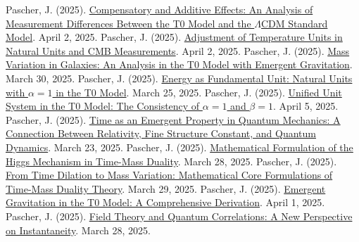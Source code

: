 \documentclass[12pt,a4paper]{article}
\begin{document}
	\begin{thebibliography}{99}
		 Pascher, J. (2025). \href{https://github.com/jpascher/T0-Time-Mass-Duality/tree/main/2/pdf/English/MessdifferenzenT0StandardEn.pdf}{Compensatory and Additive Effects: An Analysis of Measurement Differences Between the T0 Model and the \(\Lambda\)CDM Standard Model}. April 2, 2025.
		 Pascher, J. (2025). \href{https://github.com/jpascher/T0-Time-Mass-Duality/tree/main/2/pdf/English/TempEinheitenCMBEn.pdf}{Adjustment of Temperature Units in Natural Units and CMB Measurements}. April 2, 2025.
		 Pascher, J. (2025). \href{https://github.com/jpascher/T0-Time-Mass-Duality/tree/main/2/pdf/English/MassVarGalaxienEn.pdf}{Mass Variation in Galaxies: An Analysis in the T0 Model with Emergent Gravitation}. March 30, 2025.
		 Pascher, J. (2025). \href{https://github.com/jpascher/T0-Time-Mass-Duality/tree/main/2/pdf/English/NatEinheitenAlpha1En.pdf}{Energy as Fundamental Unit: Natural Units with \(\alpha = 1\) in the T0 Model}. March 25, 2025.
		 Pascher, J. (2025). \href{https://github.com/jpascher/T0-Time-Mass-Duality/tree/main/2/pdf/English/Alpha1Beta1KonsistenzEn.pdf}{Unified Unit System in the T0 Model: The Consistency of \(\alpha = 1\) and \(\beta = 1\)}. April 5, 2025.
		 Pascher, J. (2025). \href{https://github.com/jpascher/T0-Time-Mass-Duality/tree/main/2/pdf/English/ZeitEmergentQMEn.pdf}{Time as an Emergent Property in Quantum Mechanics: A Connection Between Relativity, Fine Structure Constant, and Quantum Dynamics}. March 23, 2025.
		 Pascher, J. (2025). \href{https://github.com/jpascher/T0-Time-Mass-Duality/tree/main/2/pdf/English/MathHiggsZeitMasseEn.pdf}{Mathematical Formulation of the Higgs Mechanism in Time-Mass Duality}. March 28, 2025.
		 Pascher, J. (2025). \href{https://github.com/jpascher/T0-Time-Mass-Duality/tree/main/2/pdf/English/MathZeitMasseLagrangeEn.pdf}{From Time Dilation to Mass Variation: Mathematical Core Formulations of Time-Mass Duality Theory}. March 29, 2025.
		 Pascher, J. (2025). \href{https://github.com/jpascher/T0-Time-Mass-Duality/tree/main/2/pdf/English/EmergentGravT0En.pdf}{Emergent Gravitation in the T0 Model: A Comprehensive Derivation}. April 1, 2025.
		 Pascher, J. (2025). \href{https://github.com/jpascher/T0-Time-Mass-Duality/tree/main/2/pdf/English/FeldtheorieQuantenEn.pdf}{Field Theory and Quantum Correlations: A New Perspective on Instantaneity}. March 28, 2025.

\end{thebibliography}
\end{document}
